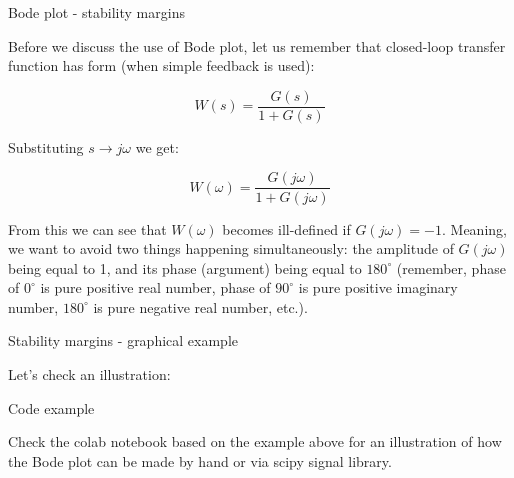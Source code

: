 \documentclass{beamer}
\newcommand{\degree}{^{\circ}}
\begin{document}
\begin{frame}{Bode plot - stability margins}
\begin{flushleft}

Before we discuss the use of Bode plot, let us remember that closed-loop transfer function has form (when simple feedback is used):

\begin{equation}
    W(s) = \frac{G(s)}{1 + G(s)}
\end{equation}

Substituting $s \longrightarrow j \omega$ we get:

\begin{equation}
    W(\omega) = \frac{G(j \omega)}{1 + G(j \omega)}
\end{equation}

From this we can see that $W(\omega)$ becomes ill-defined if $G(j \omega) = -1$. Meaning, we want to avoid two things happening simultaneously: the amplitude of $G(j \omega)$ being equal to 1, and its phase (argument) being equal to $180\degree$ (remember, phase of $0\degree$ is pure positive real number, phase of $90\degree$ is pure positive imaginary number, $180\degree$ is pure negative real number, etc.).

\end{flushleft}
\end{frame}





\begin{frame}{Stability margins - graphical example}
\begin{flushleft}

Let's check an illustration:

\bigskip

\centerline{\textcolor{black}{}}


\end{flushleft}
\end{frame}




\begin{frame}{Code example}
\begin{flushleft}

Check the colab notebook based on the example above for an illustration of how the Bode plot can be made by hand or via scipy signal library.

\bigskip

\centerline{\textcolor{black}{}}


\end{flushleft}
\end{frame}
\end{document}
